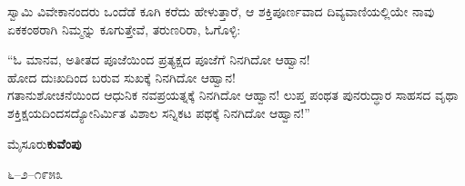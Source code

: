 ಸ್ವಾಮಿ ವಿವೇಕಾನಂದರು ಒಂದೆಡೆ ಕೂಗಿ ಕರೆದು ಹೇಳುತ್ತಾರೆ, ಆ ಶಕ್ತಿಪೂರ್ಣವಾದ ದಿವ್ಯವಾಣಿಯಲ್ಲಿಯೇ ನಾವು ಏಕಕಂಠರಾಗಿ ನಿಮ್ಮನ್ನು ಕೂಗುತ್ತೇವೆ, ತರುಣರಿರಾ, ಓಗೊಳ್ಳಿ:

“ಓ ಮಾನವ, ಅತೀತದ ಪೂಜೆಯಿಂದ ಪ್ರತ್ಯಕ್ಷದ ಪೂಜೆಗೆ ನಿನಗಿದೋ ಆಹ್ವಾನ!\\ಹೋದ ದುಃಖದಿಂದ ಬರುವ ಸುಖಕ್ಕೆ ನಿನಗಿದೋ ಆಹ್ವಾನ!\\ಗತಾನುಶೋಚನೆಯಿಂದ ಆಧುನಿಕ ನವಪ್ರಯತ್ನಕ್ಕೆ ನಿನಗಿದೋ ಆಹ್ವಾನ! ಲುಪ್ತ ಪಂಥತ ಪುನರುದ್ಧಾರ ಸಾಹಸದ ವೃಥಾ ಶಕ್ತಿಕ್ಷಯದಿಂದಸದ್ಯೋನಿರ್ಮಿತ ವಿಶಾಲ ಸನ್ನಿಕಟ ಪಥಕ್ಕೆ ನಿನಗಿದೋ ಆಹ್ವಾನ!”

\bigskip

\noindent
ಮೈಸೂರು\hfill \textbf{ಕುವೆಂಪು}

\noindent
೬–೨–೧೯೫೩

